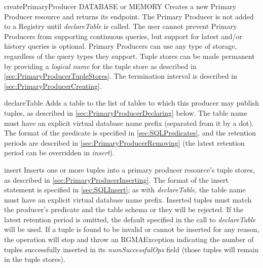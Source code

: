 \begin{method}{createPrimaryProducer}
 {DATABASE or MEMORY}
\desc
Creates a new Primary Producer resource and returns its endpoint. The
Primary Producer is not added to a Registry until
\textit{declareTable} is called. The user cannot prevent Primary
Producers from supporting continuous queries, but support for latest
and/or history queries is optional. Primary Producers can use any type
of storage, regardless of the query types they support. Tuple stores can be
made permanent by providing a \textit{logical name} for the tuple store as
described in \ref{sec:PrimaryProducerTupleStores}. The termination interval is
described in \ref{sec:PrimaryProducerCreating}.
\end{method}

\begin{method}{declareTable}
\OK
\desc
Adds a table to the list of tables to which this producer may publish tuples,
as described in \ref{sec:PrimaryProducerDeclaring} below. The table name must
have an explicit virtual database name prefix (separated from it by a dot).
The format of the predicate is specified in \ref{sec:SQLPredicates}, and
the retention periods are described in \ref{sec:PrimaryProducerRemoving} (the 
latest retention period can be overridden in \textit{insert}). 
\end{method}

\begin{method}{insert}
\OK
\desc
Inserts one or more tuples into a primary producer resource's tuple stores, as
described in \ref{sec:PrimaryProducerInserting}. The format of the insert
statement is specified in \ref{sec:SQLInsert}; as with \textit{declareTable},
the table name must have an explicit virtual database name prefix. Inserted
tuples must match the producer's predicate and the table schema or they will be
rejected. If the latest retention period is omitted, the default specified in
the call to \textit{declareTable} will be used. If a tuple is found to be invalid or cannot
be inserted for any reason, the operation will stop and throw an
RGMAException indicating the number of tuples successfully inserted in
its \textit{numSuccessfulOps} field (those tuples will remain in the tuple
stores).
\end{method}

